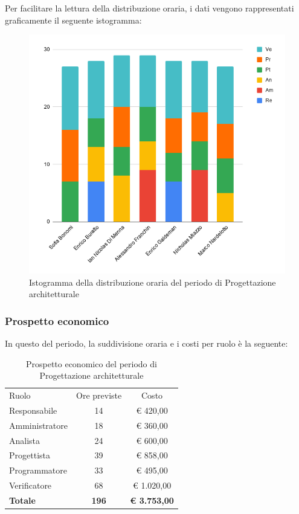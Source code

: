 \documentclass[../piano-di-progetto.tex]{subfiles}
\begin{document}
  Per facilitare la lettura della distribuzione oraria, i dati vengono rappresentati graficamente il seguente istogramma:
  \begin{figure}[H]
    \centering
    \includegraphics[width=12cm]{img/ore-progettazione.png}
    \caption{Istogramma della distribuzione oraria del periodo di Progettazione architetturale}
    \label{fig:ore-componente-progettazione}
  \end{figure}

  \subsubsection{Prospetto economico}
  In questo del periodo, la suddivisione oraria e i costi per ruolo è la seguente:

  \begin{table}[H]
    \centering
    \begin{tabular}{lcc}
      Ruolo           & Ore previste & Costo               \\
      Responsabile    & 14           & € 420,00            \\
      Amministratore  & 18           & € 360,00            \\
      Analista        & 24           & € 600,00            \\
      Progettista     & 39           & € 858,00            \\
      Programmatore   & 33           & € 495,00            \\
      Verificatore    & 68           & € 1.020,00          \\
      \textbf{Totale} & \textbf{196} & \textbf{€ 3.753,00}
    \end{tabular}
    \caption{Prospetto economico del periodo di Progettazione architetturale}
  \end{table}
\end{document}

